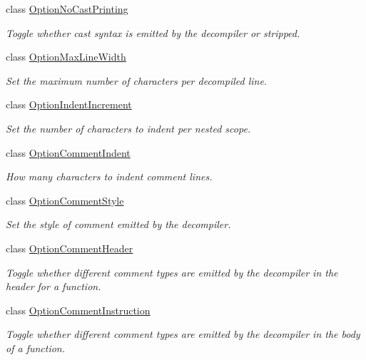 \begin{DoxyCompactItemize}
class \mbox{\hyperlink{class_option_no_cast_printing}{Option\+No\+Cast\+Printing}}
\begin{DoxyCompactList}\small\item\em Toggle whether {\itshape cast} syntax is emitted by the decompiler or stripped. \end{DoxyCompactList}\item 
class \mbox{\hyperlink{class_option_max_line_width}{Option\+Max\+Line\+Width}}
\begin{DoxyCompactList}\small\item\em Set the maximum number of characters per decompiled line. \end{DoxyCompactList}\item 
class \mbox{\hyperlink{class_option_indent_increment}{Option\+Indent\+Increment}}
\begin{DoxyCompactList}\small\item\em Set the number of characters to indent per nested scope. \end{DoxyCompactList}\item 
class \mbox{\hyperlink{class_option_comment_indent}{Option\+Comment\+Indent}}
\begin{DoxyCompactList}\small\item\em How many characters to indent comment lines. \end{DoxyCompactList}\item 
class \mbox{\hyperlink{class_option_comment_style}{Option\+Comment\+Style}}
\begin{DoxyCompactList}\small\item\em Set the style of comment emitted by the decompiler. \end{DoxyCompactList}\item 
class \mbox{\hyperlink{class_option_comment_header}{Option\+Comment\+Header}}
\begin{DoxyCompactList}\small\item\em Toggle whether different comment {\itshape types} are emitted by the decompiler in the header for a function. \end{DoxyCompactList}\item 
class \mbox{\hyperlink{class_option_comment_instruction}{Option\+Comment\+Instruction}}
\begin{DoxyCompactList}\small\item\em Toggle whether different comment {\itshape types} are emitted by the decompiler in the body of a function. \end{DoxyCompactList}\item 

\end{DoxyCompactItemize}

